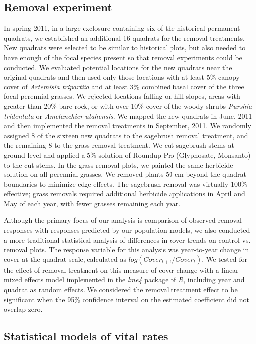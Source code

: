 \documentclass[11pt]{article}
\begin{document}
\begin{doublespacing}
\subsection*{Removal experiment}
In spring 2011, in a large exclosure containing six of the historical permanent quadrats, we established an additional 16 quadrats for the removal treatments. New quadrats were selected to be similar to historical plots, but also needed to have enough of the focal species present so that removal experiments could be conducted. We evaluated potential locations for the new quadrats near the original quadrats and then used only those locations with at least 5\% canopy cover of \textit{Artemisia tripartita} and at least 3\% combined basal cover of the three focal perennial grasses. We rejected locations falling on hill slopes, areas with greater than 20\% bare rock, or with over 10\% cover of the woody shrubs \textit{Purshia tridentata} or \textit{Amelanchier utahensis}. We mapped the new quadrats in June, 2011 and then implemented the removal treatments in September, 2011. We randomly assigned 8 of the sixteen new quadrats to the sagebrush removal treatment, and the remaining 8 to the grass removal treatment. We cut sagebrush stems at ground level and applied a 5\% solution of Roundup Pro (Glyphosate, Monsanto) to the cut stems. In the grass removal plots, we painted the same herbicide solution on all perennial grasses. We removed plants 50 cm beyond the quadrat boundaries to minimize edge effects. The sagebrush removal was virtually 100\% effective; grass removals required additional herbicide applications in April and May of each year, with fewer grasses remaining each year.

Although the primary focus of our analysis is comparison of observed removal responses with responses predicted by our population models, we also conducted a more traditional statistical analysis of differences in cover trends on control vs. removal plots. The response variable for this analysis was year-to-year change in cover at the quadrat scale, calculated as $log(Cover_{t+1}/Cover_t)$. We tested for the effect of removal treatment on this measure of cover change with a linear mixed effects model implemented in the \textit{lme4} package \citep{Bates2015} of \textit{R}, including year and quadrat as random effects. We considered the removal treatment effect to be significant when the 95\% confidence interval on the estimated coefficient did not overlap zero.

\subsection*{Statistical models of vital rates}


\end{doublespacing}
\end{document}
